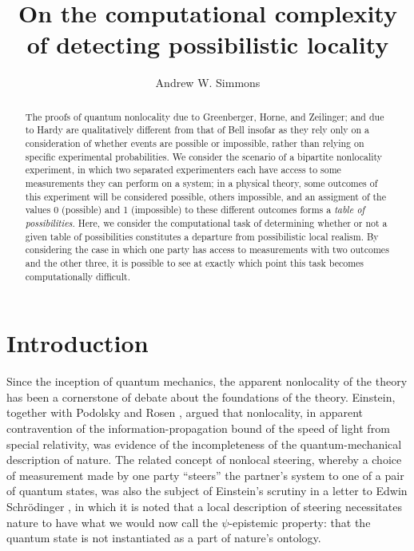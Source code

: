 \documentclass[reprint]{revtex4-1}
\theoremstyle{definition}
\begin{document}
\title{On the computational complexity of detecting possibilistic locality}
\author{Andrew W. Simmons}
\begin{abstract}
The proofs of quantum nonlocality due to Greenberger, Horne, and Zeilinger; and due to Hardy are qualitatively different from that of Bell insofar as they rely only on a consideration of whether events are possible or impossible, rather than relying on specific experimental probabilities. We consider the scenario of a bipartite nonlocality experiment, in which two separated experimenters each have access to some measurements they can perform on a system; in a physical theory, some outcomes of this experiment will be considered possible, others impossible, and an assigment of the values 0 (possible) and 1 (impossible) to these different outcomes forms a \emph{table of possibilities}. Here, we consider the computational task of determining whether or not a given table of possibilities constitutes a departure from possibilistic local realism. By considering the case in which one party has access to measurements with two outcomes and the other three, it is possible to see at exactly which point this task becomes computationally difficult.
\end{abstract}
\maketitle

\section{Introduction}
Since the inception of quantum mechanics, the apparent nonlocality of the theory has been a cornerstone of debate about the foundations of the theory. Einstein, together with Podolsky and Rosen \cite{EPR}, argued that nonlocality, in apparent contravention of the information-propagation bound of the speed of light from special relativity, was evidence of the incompleteness of the quantum-mechanical description of nature. The related concept of nonlocal steering, whereby a choice of measurement made by one party ``steers'' the partner's system to one of a pair of quantum states, was also the subject of Einstein's scrutiny in a letter to Edwin Schr\"{o}dinger \cite{Eins1935-6-19}, in which it is noted that a local description of steering necessitates nature to have what we would now call the $\psi$-epistemic property: that the quantum state is not instantiated as a part of nature's ontology.
\end{document}
